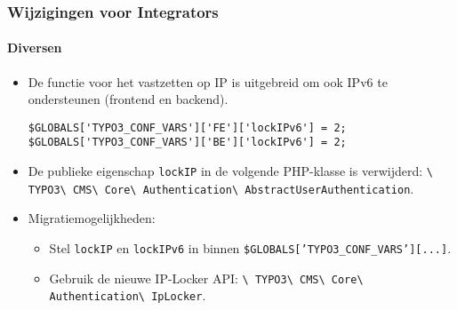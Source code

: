 \begin{frame}[fragile]
	\frametitle{Wijzigingen voor Integrators}
	\framesubtitle{Diversen}

	\lstset{basicstyle=\tiny\ttfamily}

	\begin{itemize}

		\item De functie voor het vastzetten op IP is uitgebreid om ook IPv6 te ondersteunen
			(frontend en backend).

\begin{lstlisting}
$GLOBALS['TYPO3_CONF_VARS']['FE']['lockIPv6'] = 2;
$GLOBALS['TYPO3_CONF_VARS']['BE']['lockIPv6'] = 2;
\end{lstlisting}

		\item De publieke eigenschap \texttt{lockIP} in de volgende PHP-klasse is verwijderd:\newline
			\small
				\texttt{\textbackslash
					TYPO3\textbackslash
					CMS\textbackslash
					Core\textbackslash
					Authentication\textbackslash
					AbstractUserAuthentication}.
			\normalsize

		\item Migratiemogelijkheden:

			\begin{itemize}\smaller
				\item[\ding{228}] Stel \texttt{lockIP} en \texttt{lockIPv6} in binnen \texttt{\$GLOBALS['TYPO3\_CONF\_VARS'][...]}.
				\item[\ding{228}] Gebruik de nieuwe IP-Locker API:
					\texttt{\textbackslash
						TYPO3\textbackslash
						CMS\textbackslash
						Core\textbackslash
						Authentication\textbackslash
						IpLocker}.
			\end{itemize}\normalsize


	\end{itemize}

\end{frame}

